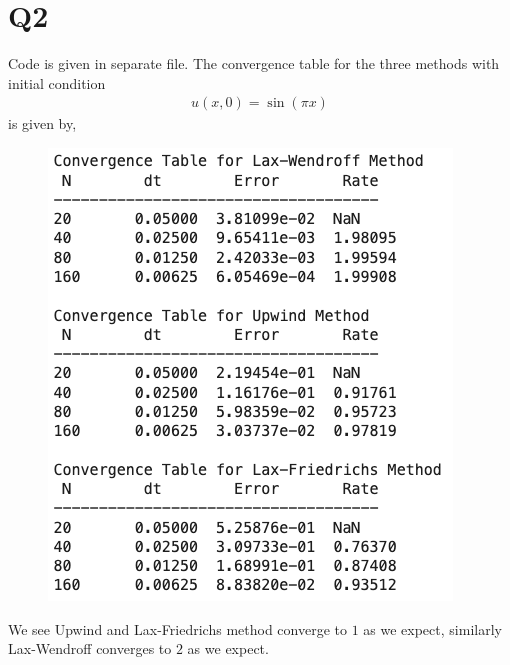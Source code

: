 \pagebreak


\section*{Q2}
\begin{solution}[\textbf{2}]
\hfill\break
Code is given in separate file. The convergence table for the three methods with initial condition 
\begin{align*}
 u(x,0) = \sin(\pi x)
\end{align*}
is given by,
\begin{figure}[H]
    \centering
    \includegraphics[scale=0.5]{./figures/q2-table.png}
\end{figure}
We see Upwind and Lax-Friedrichs method converge to $1$ as we expect, similarly Lax-Wendroff converges to $2$ as we expect.
\end{solution}

